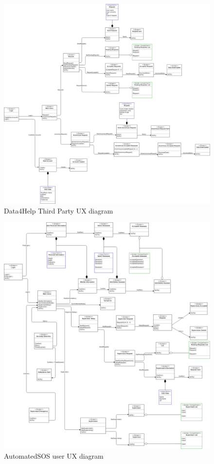 \begin{flushleft}
\begin{figure}[H]
	\centering
	\includegraphics[scale=0.27]{Images/User_interface/Trackme-ThirdPartyD4H}
	\caption{Data4Help Third Party UX diagram}
\end{figure}

\newpage

{}



\begin{figure}[H]
	\centering
	\includegraphics[scale=0.26]{Images/User_interface/Trackme-AutomatedSos}
	\caption{AutomatedSOS user UX diagram}
\end{figure}


\end{flushleft}